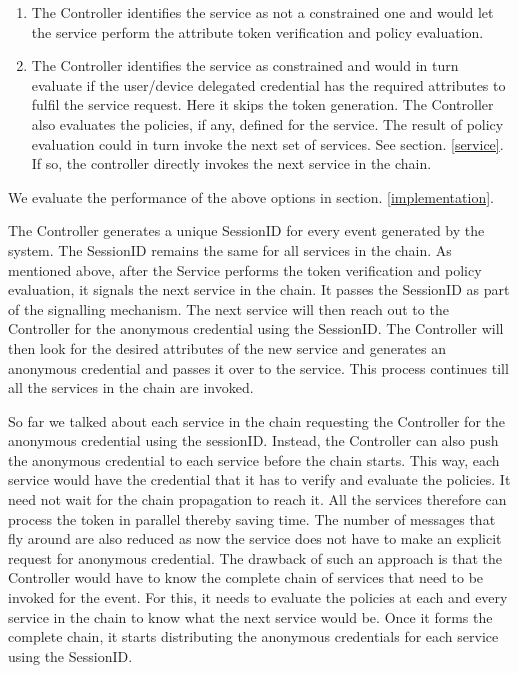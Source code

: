 \documentclass[journal]{IEEEtran}
\begin{document}
\begin{enumerate}[label=\alph*)]
	\item The Controller identifies the service as not a constrained one and would let the service perform the attribute token verification and policy evaluation.
	\item The Controller identifies the service as constrained and would in turn evaluate if the user/device delegated credential has the required attributes to fulfil the service request. Here it skips the token generation. The Controller also evaluates the policies, if any, defined for the service. The result of policy evaluation could in turn invoke the next set of services. See section. \ref{service}. If so, the controller directly invokes the next service in the chain.
\end{enumerate}

We evaluate the performance of the above options in section. \ref{implementation}.

The Controller generates a unique SessionID for every event generated by the system. The SessionID remains the same for all services in the chain. As mentioned above, after the Service performs the token verification and policy evaluation, it signals the next service in the chain. It passes the SessionID as part of the signalling mechanism. The next service will then reach out to the Controller for the anonymous credential using the SessionID. The Controller will then look for the desired attributes of the new service and generates an anonymous credential and passes it over to the service. This process continues till all the services in the chain are invoked.

So far we talked about each service in the chain requesting the Controller for the anonymous credential using the sessionID. Instead, the Controller can also push the anonymous credential to each service before the chain starts. This way, each service would have the credential that it has to verify and evaluate the policies. It need not wait for the chain propagation to reach it. All the services therefore can process the token in parallel thereby saving time. The number of messages that fly around are also reduced as now the service does not have to make an explicit request for anonymous credential. The drawback of such an approach is that the Controller would have to know the complete chain of services that need to be invoked for the event. For this, it needs to evaluate the policies at each and every service in the chain to know what the next service would be. Once it forms the complete chain, it starts distributing the anonymous credentials for each service using the SessionID. 
\end{document}
